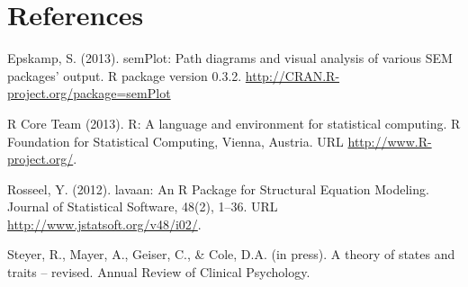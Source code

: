 \documentclass[10pt]{article}\usepackage[]{graphicx}\usepackage[]{xcolor}
\begin{document}
\section*{References}

\begin{description}
\item Epskamp, S. (2013). semPlot: Path diagrams and visual analysis of various
  SEM packages' output. R package version 0.3.2.  \url{http://CRAN.R-project.org/package=semPlot}
\item R Core Team (2013). R: A language and environment for statistical computing.
  R Foundation for Statistical Computing, Vienna, Austria. URL \url{http://www.R-project.org/}.
\item Rosseel, Y. (2012). lavaan: An R Package for Structural Equation Modeling.
  Journal of Statistical Software, 48(2), 1--36. URL  \url{http://www.jstatsoft.org/v48/i02/}.
\item Steyer, R., Mayer, A., Geiser, C., \& Cole, D.A. (in press). A theory of states and traits -- revised. Annual Review of Clinical Psychology.
\end{description}
\end{document}
